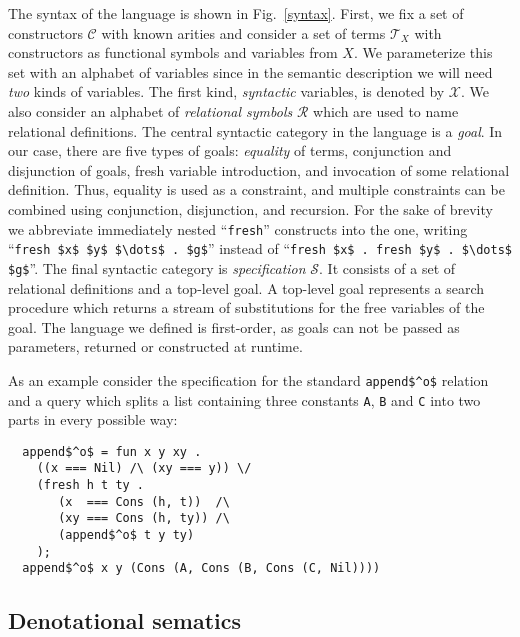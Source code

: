 The syntax of the language is shown in Fig.~\ref{syntax}. First, we fix a set of constructors $\mathcal{C}$ with known arities and consider
a set of terms $\mathcal{T}_X$ with constructors as functional symbols and variables from $X$. We parameterize this set with an alphabet of
variables since in the semantic description we will need \emph{two} kinds of variables. The first kind, \emph{syntactic} variables, is denoted
by $\mathcal{X}$. We also consider an alphabet of \emph{relational symbols} $\mathcal{R}$ which are used to name relational definitions.
The central syntactic category in the language is a \emph{goal}. In our case, there are five types of goals: \emph{equality} of terms,
conjunction and disjunction of goals, fresh variable introduction, and invocation of some relational definition. Thus, equality is used
as a constraint, and multiple constraints can be combined using conjunction, disjunction, and recursion. For the sake of brevity we
abbreviate immediately nested ``\lstinline|fresh|'' constructs into the one, writing ``\lstinline|fresh $x$ $y$ $\dots$ . $g$|'' instead of
``\lstinline|fresh $x$ . fresh $y$ . $\dots$ $g$|''. The final syntactic category is \emph{specification} $\mathcal{S}$. It consists of a set
of relational definitions and a top-level goal. A top-level goal represents a search procedure which returns a stream of substitutions for
the free variables of the goal. The language we defined is first-order, as goals can not be passed as parameters,
returned or constructed at runtime.

As an example consider the specification for the standard \lstinline|append$^o$| relation and a query which splits a list containing
three constants \lstinline|A|, \lstinline|B| and \lstinline|C| into two parts in every possible way:

\begin{minipage}{\linewidth}
\begin{lstlisting}
  append$^o$ = fun x y xy .
    ((x === Nil) /\ (xy === y)) \/
    (fresh h t ty .
       (x  === Cons (h, t))  /\
       (xy === Cons (h, ty)) /\
       (append$^o$ t y ty)
    );
  append$^o$ x y (Cons (A, Cons (B, Cons (C, Nil))))
\end{lstlisting}
\end{minipage}

\subsection{Denotational sematics}

